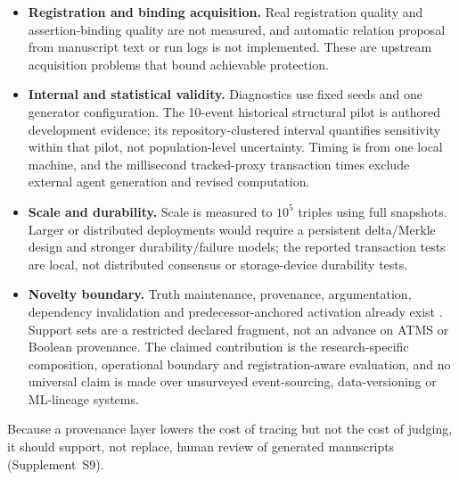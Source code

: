 \documentclass[journal]{IEEEtran}
\newcommand{\suppl}[1]{Supplement~#1}
\begin{document}
\begin{itemize}
    \item \textbf{Registration and binding acquisition.} Real registration quality and assertion-binding quality are not measured, and automatic relation proposal from manuscript text or run logs is not implemented. These are upstream acquisition problems that bound achievable protection.
    \item \textbf{Internal and statistical validity.} Diagnostics use fixed seeds and one generator configuration. The 10-event historical structural pilot is authored development evidence; its repository-clustered interval quantifies sensitivity within that pilot, not population-level uncertainty. Timing is from one local machine, and the millisecond tracked-proxy transaction times exclude external agent generation and revised computation.
    \item \textbf{Scale and durability.} Scale is measured to $10^5$ triples using full snapshots. Larger or distributed deployments would require a persistent delta/Merkle design and stronger durability/failure models; the reported transaction tests are local, not distributed consensus or storage-device durability tests.
    \item \textbf{Novelty boundary.} Truth maintenance, provenance, argumentation, dependency invalidation and predecessor-anchored activation already exist \cite{doyle1979tms,buneman2001provenance,dung1995acceptability,feldman1979make,he2026continuity}. Support sets are a restricted declared fragment, not an advance on ATMS or Boolean provenance. The claimed contribution is the research-specific composition, operational boundary and registration-aware evaluation, and no universal claim is made over unsurveyed event-sourcing, data-versioning or ML-lineage systems.
\end{itemize}
Because a provenance layer lowers the cost of tracing but not the cost of judging, it should support, not replace, human review of generated manuscripts (\suppl{S9}).
\end{document}
